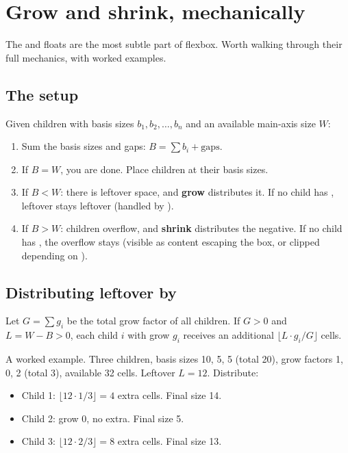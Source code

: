 \section{Grow and shrink, mechanically}
\label{sec:layout:grow-shrink}

The  and  floats are the most subtle part
of flexbox. Worth walking through their full mechanics, with
worked examples.

\subsection{The setup}

Given children with basis sizes $b_1, b_2, \dots, b_n$ and an
available main-axis size $W$:

\begin{enumerate}[leftmargin=*]
  \item Sum the basis sizes and gaps: $B = \sum b_i + \text{gaps}$.
  \item If $B = W$, you are done. Place children at their basis
    sizes.
  \item If $B < W$: there is leftover space, and \textbf{grow}
    distributes it. If no child has , leftover stays
    leftover (handled by ).
  \item If $B > W$: children overflow, and \textbf{shrink}
    distributes the negative. If no child has ,
    the overflow stays (visible as content escaping the box, or
    clipped depending on ).
\end{enumerate}

\subsection{Distributing leftover by }

Let $G = \sum g_i$ be the total grow factor of all children. If
$G > 0$ and $L = W - B > 0$, each child $i$ with grow $g_i$ receives
an additional $\lfloor L \cdot g_i / G \rfloor$ cells.

A worked example. Three children, basis sizes 10, 5, 5 (total 20),
grow factors 1, 0, 2 (total 3), available 32 cells. Leftover
$L = 12$. Distribute:

\begin{itemize}[leftmargin=*]
  \item Child 1: $\lfloor 12 \cdot 1 / 3 \rfloor = 4$ extra cells.
    Final size 14.
  \item Child 2: grow 0, no extra. Final size 5.
  \item Child 3: $\lfloor 12 \cdot 2 / 3 \rfloor = 8$ extra cells.
    Final size 13.
\end{itemize}

